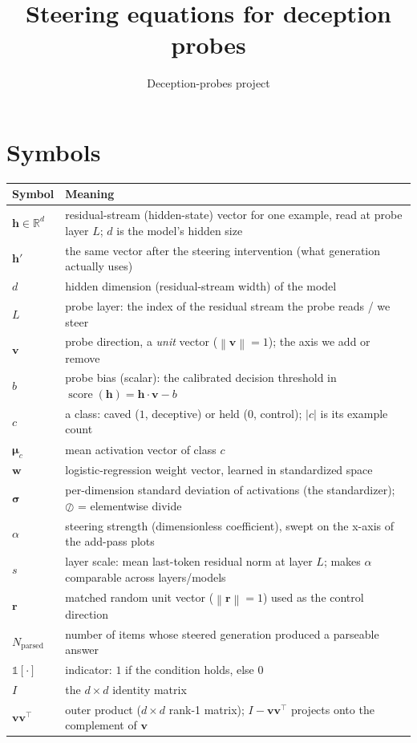 \documentclass[11pt]{article}
\title{Steering equations for deception probes}
\author{Deception-probes project}
\date{}
\newcommand{\vv}{\bm{v}}
\newcommand{\hh}{\bm{h}}
\newcommand{\rr}{\bm{r}}
\newcommand{\muvec}{\bm{\mu}}
\newcommand{\norm}[1]{\left\lVert #1 \right\rVert}
\newcommand{\ind}{\mathbb{1}}
\begin{document}
\maketitle

\section*{Symbols}

\renewcommand{\arraystretch}{1.3}
\noindent
\begin{tabular}{@{}p{2.3cm}p{13cm}@{}}
\hline
Symbol & Meaning \\
\hline
$\hh \in \mathbb{R}^d$ & residual-stream (hidden-state) vector for one example, read at probe layer $L$; $d$ is the model's hidden size \\
$\hh'$ & the same vector after the steering intervention (what generation actually uses) \\
$d$ & hidden dimension (residual-stream width) of the model \\
$L$ & probe layer: the index of the residual stream the probe reads / we steer \\
$\vv$ & probe direction, a \emph{unit} vector ($\norm{\vv}=1$); the axis we add or remove \\
$b$ & probe bias (scalar): the calibrated decision threshold in $\operatorname{score}(\hh)=\hh\cdot\vv-b$ \\
$c$ & a class: caved ($1$, deceptive) or held ($0$, control); $\lvert c\rvert$ is its example count \\
$\muvec_{c}$ & mean activation vector of class $c$ \\
$\bm{w}$ & logistic-regression weight vector, learned in standardized space \\
$\bm{\sigma}$ & per-dimension standard deviation of activations (the standardizer); $\oslash$ = elementwise divide \\
$\alpha$ & steering strength (dimensionless coefficient), swept on the x-axis of the add-pass plots \\
$s$ & layer scale: mean last-token residual norm at layer $L$; makes $\alpha$ comparable across layers/models \\
$\rr$ & matched random unit vector ($\norm{\rr}=1$) used as the control direction \\
$N_{\text{parsed}}$ & number of items whose steered generation produced a parseable answer \\
$\ind[\cdot]$ & indicator: $1$ if the condition holds, else $0$ \\
$I$ & the $d\times d$ identity matrix \\
$\vv\vv^{\top}$ & outer product ($d\times d$ rank-1 matrix); $I-\vv\vv^{\top}$ projects onto the complement of $\vv$ \\
\hline
\end{tabular}
\end{document}
